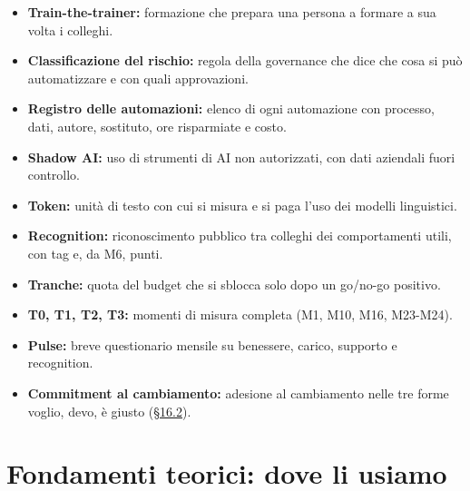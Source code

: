 \documentclass[11pt,a4paper]{article}
\begin{document}
\begin{itemize}
\item \textbf{Train-the-trainer:} formazione che prepara una persona a formare a sua volta i colleghi.
\item \textbf{Classificazione del rischio:} regola della governance che dice che cosa si può automatizzare e con quali approvazioni.
\item \textbf{Registro delle automazioni:} elenco di ogni automazione con processo, dati, autore, sostituto, ore risparmiate e costo.
\item \textbf{Shadow AI:} uso di strumenti di AI non autorizzati, con dati aziendali fuori controllo.
\item \textbf{Token:} unità di testo con cui si misura e si paga l'uso dei modelli linguistici.
\item \textbf{Recognition:} riconoscimento pubblico tra colleghi dei comportamenti utili, con tag e, da M6, punti.
\item \textbf{Tranche:} quota del budget che si sblocca solo dopo un go/no-go positivo.
\item \textbf{T0, T1, T2, T3:} momenti di misura completa (M1, M10, M16, M23-M24).
\item \textbf{Pulse:} breve questionario mensile su benessere, carico, supporto e recognition.
\item \textbf{Commitment al cambiamento:} adesione al cambiamento nelle tre forme \guillemotleft{}voglio\guillemotright{}, \guillemotleft{}devo\guillemotright{}, \guillemotleft{}è giusto\guillemotright{} (\hyperref[sec:16.2]{\S16.2}).
\end{itemize}

\section{Fondamenti teorici: dove li usiamo}\label{sec:22}
\end{document}

